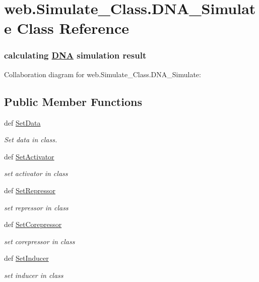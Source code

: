 \hypertarget{classweb_1_1_simulate___class_1_1_d_n_a___simulate}{\section{web.\-Simulate\-\_\-\-Class.\-D\-N\-A\-\_\-\-Simulate Class Reference}
\label{classweb_1_1_simulate___class_1_1_d_n_a___simulate}
}


\subsubsection*{calculating \hyperlink{class_d_n_a}{D\-N\-A} simulation result } 




Collaboration diagram for web.\-Simulate\-\_\-\-Class.\-D\-N\-A\-\_\-\-Simulate\-:
\subsection*{Public Member Functions}
\begin{DoxyCompactItemize}
\item 
def \hyperlink{classweb_1_1_simulate___class_1_1_d_n_a___simulate_a06ff5bd8c89a820405d937a5f8a837f3}{Set\-Data}
\begin{DoxyCompactList}\small\item\em Set data in class. \end{DoxyCompactList}\item 
def \hyperlink{classweb_1_1_simulate___class_1_1_d_n_a___simulate_ad17aed6fe820df86a76eae9e307c6fbc}{Set\-Activator}
\begin{DoxyCompactList}\small\item\em set activator in class \end{DoxyCompactList}\item 
def \hyperlink{classweb_1_1_simulate___class_1_1_d_n_a___simulate_af3ad470a356961ff4019e740f813e321}{Set\-Repressor}
\begin{DoxyCompactList}\small\item\em set repressor in class \end{DoxyCompactList}\item 
def \hyperlink{classweb_1_1_simulate___class_1_1_d_n_a___simulate_a467aabf0e04b68c0b813931ffdfbd86c}{Set\-Corepressor}
\begin{DoxyCompactList}\small\item\em set corepressor in class \end{DoxyCompactList}\item 
def \hyperlink{classweb_1_1_simulate___class_1_1_d_n_a___simulate_ad7ed3917ea1662b7d8ebded6ae6c9275}{Set\-Inducer}
\begin{DoxyCompactList}\small\item\em set inducer in class \end{DoxyCompactList}\end{DoxyCompactItemize}
